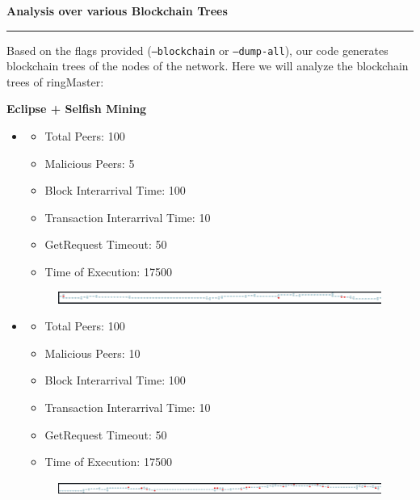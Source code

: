 \documentclass[a4paper,12pt]{article}
\newenvironment{solution}[2][]{%
\begin{mdframed}[linecolor=blue!70!black, linewidth=2pt, roundcorner=10pt, backgroundcolor=yellow!10!white, skipabove=12pt, skipbelow=12pt]%
	\textbf{\large #2}
	\par\noindent\rule{\textwidth}{0.4pt}
}{
\end{mdframed}
}
\begin{document}
\begin{solution}{Analysis over various Blockchain Trees}
	Based on the flags provided (\texttt{--blockchain} or \texttt{--dump-all}), our code generates blockchain trees of the nodes of the network. Here we will analyze the blockchain trees of ringMaster:

	\textbf{Eclipse + Selfish Mining}\\
	\begin{itemize}
		\item \begin{itemize}
			\vspace{-7pt}
			\item Total Peers: 100
			\vspace{-7pt}
			\item Malicious Peers: 5
			\vspace{-7pt}
			\item Block Interarrival Time: 100
			\vspace{-7pt}
			\item Transaction Interarrival Time: 10
			\vspace{-7pt}
			\item GetRequest Timeout: 50 
			\vspace{-7pt}
			\item Time of Execution: 17500
		\end{itemize}
		 \begin{figure}[H]
				\centering
				\includegraphics[width=\textwidth]{images/i_100_5_10_100_50_SE.png} 
			\end{figure}
			\item \begin{itemize}
				\vspace{-7pt}
				\item Total Peers: 100
				\vspace{-7pt}
				\item Malicious Peers: 10
				\vspace{-7pt}
				\item Block Interarrival Time: 100
				\vspace{-7pt}
				\item Transaction Interarrival Time: 10
				\vspace{-7pt}
				\item GetRequest Timeout: 50 
				\vspace{-7pt}
				\item Time of Execution: 17500
			\end{itemize}
			 \begin{figure}[H]
					\centering
					\includegraphics[width=\textwidth]{images/i_100_10_10_100_50_SE.png} 
				\end{figure}
		

\end{itemize}
\end{solution}
\end{document}
